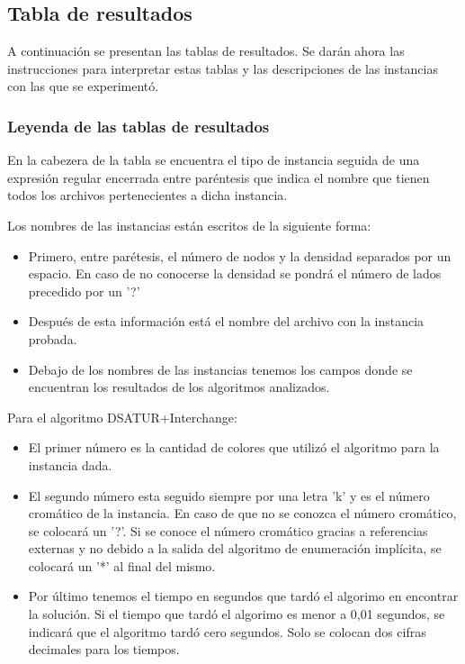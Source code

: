 \documentclass[a4paper,10pt]{article}
\begin{document}
\subsection{Tabla de resultados}
A continuaci\'on se presentan las tablas de resultados. Se dar\'an ahora
las instrucciones para interpretar estas tablas y las descripciones de
las instancias con las que se experiment\'o.

\subsubsection{Leyenda de las tablas de resultados}
\indent En la cabezera de la tabla se encuentra el tipo de instancia
seguida de una expresi\'on regular encerrada entre par\'entesis
que indica el nombre que tienen todos los archivos pertenecientes
a dicha instancia.

\indent Los nombres de las instancias est\'an escritos de la siguiente forma:
\begin{itemize}
 \item Primero, entre par\'etesis, el n\'umero de nodos y la densidad
       separados por un espacio. En caso de no conocerse la densidad se
       pondr\'a el n\'umero de lados precedido por un '?'
 \item Despu\'es de esta informaci\'on est\'a el nombre del archivo con
       la instancia probada.
 \item Debajo de los nombres de las instancias tenemos los campos donde
       se encuentran los resultados de los algoritmos analizados.
\end{itemize}

\indent Para el algoritmo DSATUR+Interchange:
\begin{itemize}
 \item El primer n\'umero es la cantidad de colores que utiliz\'o el
       algoritmo para la instancia dada.
 \item El segundo n\'umero esta seguido siempre por una letra 'k' y es el n\'umero crom\'atico de la
       instancia. En caso de que no se conozca el n\'umero crom\'atico,
       se colocar\'a un '?'. Si se conoce el n\'umero crom\'atico gracias a
       referencias externas y no debido a la salida del algoritmo de
       enumeraci\'on impl\'icita, se colocar\'a un '*' al final del
       mismo.
 \item Por \'ultimo tenemos el tiempo en segundos que tard\'o el algorimo en
       encontrar la soluci\'on. Si el tiempo que tard\'o el algorimo es
       menor a 0,01 segundos, se indicar\'a que el algoritmo tard\'o
       cero segundos. Solo se colocan dos cifras decimales para los tiempos.
\end{itemize}
\end{document}
